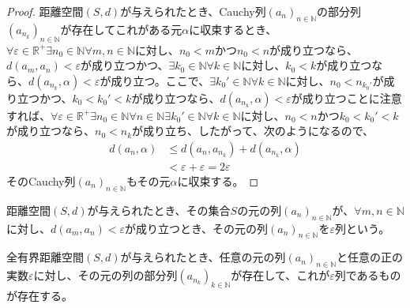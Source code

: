 \documentclass[dvipdfmx]{jsarticle}
\begin{document}
\begin{proof}
距離空間$(S,d)$が与えられたとき、Cauchy列$\left( a_{n} \right)_{n \in \mathbb{N}}$の部分列$\left( a_{n_{k}} \right)_{n \in \mathbb{N}}$が存在してこれがある元$\alpha$に収束するとき、$\forall\varepsilon \in \mathbb{R}^{+}\exists n_{0} \in \mathbb{N}\forall m,n \in \mathbb{N}$に対し、$n_{0} < m$かつ$n_{0} < n$が成り立つなら、$d\left( a_{m},a_{n} \right) < \varepsilon$が成り立つかつ、$\exists k_{0} \in \mathbb{N}\forall k \in \mathbb{N}$に対し、$k_{0} < k$が成り立つなら、$d\left( a_{n_{k}},\alpha \right) < \varepsilon$が成り立つ。ここで、$\exists k_{0}' \in \mathbb{N}\forall k \in \mathbb{N}$に対し、$n_{0} < n_{k_{0}'}$が成り立つかつ、$k_{0} < k_{0}' < k$が成り立つなら、$d\left( a_{n_{k}},\alpha \right) < \varepsilon$が成り立つことに注意すれば、$\forall\varepsilon \in \mathbb{R}^{+}\exists n_{0} \in \mathbb{N}\forall n \in \mathbb{N}\exists k_{0}' \in \mathbb{N}\forall k \in \mathbb{N}$に対し、$n_{0} < n$かつ$k_{0} < k_{0}' < k$が成り立つなら、$n_{0} < n_{k}$が成り立ち、したがって、次のようになるので、
\begin{align*}
d\left( a_{n},\alpha \right) &\leq d\left( a_{n},a_{n_{k}} \right) + d\left( a_{n_{k}},\alpha \right)\\
&< \varepsilon + \varepsilon = 2\varepsilon
\end{align*}
そのCauchy列$\left( a_{n} \right)_{n \in \mathbb{N}}$もその元$\alpha$に収束する。
\end{proof}
\begin{dfn}
距離空間$(S,d)$が与えられたとき、その集合$S$の元の列$\left( a_{n} \right)_{n \in \mathbb{N}}$が、$\forall m,n \in \mathbb{N}$に対し、$d\left( a_{m},a_{n} \right) < \varepsilon$が成り立つとき、その元の列$\left( a_{n} \right)_{n \in \mathbb{N}}$を$\varepsilon$列という。
\end{dfn}
\begin{thm}\label{8.2.4.20}
全有界距離空間$(S,d)$が与えられたとき、任意の元の列$\left( a_{n} \right)_{n \in \mathbb{N}}$と任意の正の実数$\varepsilon$に対し、その元の列の部分列$\left( a_{n_{k}} \right)_{k \in \mathbb{N}}$が存在して、これが$\varepsilon$列であるものが存在する。
\end{thm}
\end{document}
